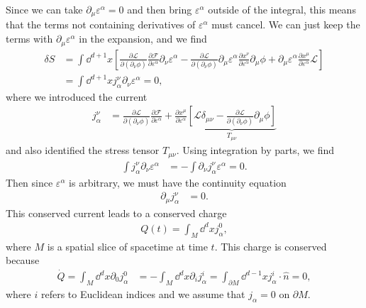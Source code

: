 \documentclass[11pt]{article}
\renewcommand{\epsilon}{\varepsilon}
\begin{document}
Since we can take $\partial_\mu \epsilon^\alpha = 0$ and then bring
$\epsilon^\alpha$  outside of the integral, this means that the terms not
containing derivatives of $\epsilon^\alpha$ must cancel. We can just keep the
terms with $\partial_\mu \epsilon^\alpha$ in the expansion, and we find
\begin{align}
  \delta S &= \int \dd^{d+1} x \left[ \frac{\partial \mathcal L}{\partial (\partial_\nu\phi)}\frac{\partial \mathcal F}{\partial \epsilon^\alpha}\partial_\nu\epsilon^\alpha - \frac{\partial \mathcal L}{\partial (\partial_\nu\phi)}\partial_\mu \epsilon^\alpha \frac{\partial x^\nu}{\partial \epsilon^\alpha}\partial_\mu \phi + \partial_\mu \epsilon^\alpha\frac{\partial x^\mu}{\partial \epsilon^\alpha} \mathcal L \right] \\
  &= \int \dd^{d+1} x j_\alpha^\nu \partial_\nu \epsilon^\alpha = 0,
\end{align}
where we introduced the current
\begin{align}
  j_\alpha^\nu &= \frac{\partial \mathcal L}{\partial (\partial_\nu \phi)}\frac{\partial \mathcal F}{\partial \epsilon^\alpha} + \frac{\partial x^\mu}{\partial \epsilon^\alpha}\underbrace{\left[\mathcal L\delta_{\mu \nu} - \frac{\partial \mathcal L}{\partial (\partial_\nu \phi)}\partial_\mu \phi\right]}_{T_{\mu \nu}}
\end{align}
and also identified the stress tensor $T_{\mu \nu}$.
Using integration by parts, we find
\begin{align}
\int j_\alpha^\nu \partial_\nu \epsilon^\alpha &= - \int \partial_\nu j_\alpha^\nu \epsilon^\alpha = 0.
\end{align}
Then since $\epsilon^\alpha$ is arbitrary, we must have the continuity equation
\begin{align}
\partial_\mu j_\alpha^\nu &= 0.
\end{align}
This conserved current
leads to a conserved charge
\begin{align}
Q(t) = \int_M \dd^dx j_\alpha^0,
\end{align}
where $M$ is a spatial slice of spacetime at time $t$.
This charge is conserved because
\begin{align}
  \dot Q = \int_{M} \dd^d x \partial_0j_\alpha^0 &= -\int_M \dd^d x \partial_i j_\alpha^i = \int_{\partial M} \dd^{d-1}x j_\alpha^i \cdot \hat n = 0,
\end{align}
where $i$ refers to Euclidean indices and we assume that $j_\alpha = 0$ on
$\partial M$.
\end{document}
